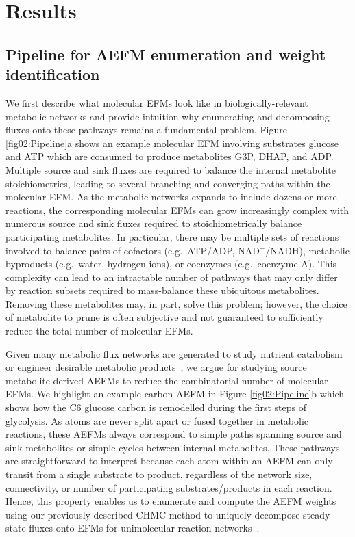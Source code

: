 \documentclass[12pt]{article}
\begin{document}
\section*{Results}

\subsection*{Pipeline for AEFM enumeration and weight identification} %





We first describe what molecular EFMs look like in biologically-relevant
metabolic networks and provide intuition why enumerating and decomposing
fluxes onto these pathways remains a fundamental problem. Figure
\ref{fig02:Pipeline}a shows an example molecular EFM involving substrates
glucose and ATP which are consumed to produce metabolites G3P, DHAP, and
ADP. Multiple source and sink fluxes are required to balance the internal
metabolite stoichiometries, leading to several branching and converging
paths within the molecular EFM. As the metabolic networks expands to
include dozens or more reactions, the corresponding molecular EFMs can
grow increasingly complex with numerous source and sink fluxes required to
stoichiometrically balance participating metabolites. In particular, there
may be multiple sets of reactions involved to balance pairs of cofactors
(e.g.\ ATP/ADP, NAD$^+$/NADH), metabolic byproducts (e.g.\ water, hydrogen
ions), or coenzymes (e.g.\ coenzyme A). This complexity can lead to an
intractable number of pathways that may only differ by reaction subsets
required to mass-balance these ubiquitous metabolites. Removing these
metabolites may, in part, solve this problem; however, the choice of
metabolite to prune is often subjective and not guaranteed to sufficiently
reduce the total number of molecular EFMs.

Given many metabolic flux networks are generated to study nutrient
catabolism~\citep{ZamboniNicola2015DtMS} or engineer desirable metabolic
products~\citep{ZanghelliniJurgen2013Efmi}, we argue for studying source
metabolite-derived AEFMs to reduce the combinatorial number of molecular
EFMs. We highlight an example carbon AEFM in Figure \ref{fig02:Pipeline}b
which shows how the C6 glucose carbon is remodelled during the first steps
of glycolysis. As atoms are never split apart or fused together in
metabolic reactions, these AEFMs always correspond to simple paths
spanning source and sink metabolites or simple cycles between internal
metabolites. These pathways are straightforward to interpret because each
atom within an AEFM can only transit from a single substrate to product,
regardless of the network size, connectivity, or number of participating
substrates/products in each reaction. Hence, this property enables us to
enumerate and compute the AEFM weights using our previously described CHMC
method to uniquely decompose steady state fluxes onto EFMs for
unimolecular reaction networks~\citep{ChitpinJustinG2023AMct}.
\end{document}
